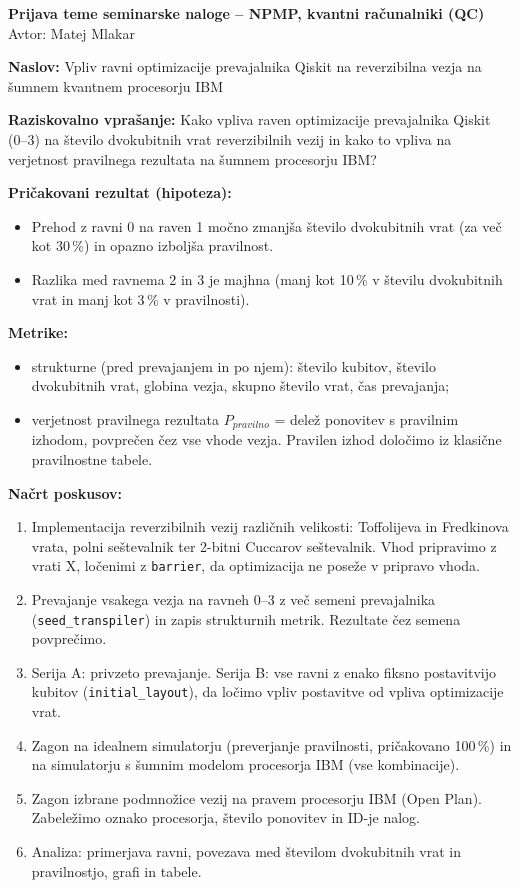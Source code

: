 \documentclass[11pt,a4paper]{article}
\begin{document}
{\large\textbf{Prijava teme seminarske naloge --
NPMP, kvantni računalniki (QC)}}\\
Avtor: Matej Mlakar \hfill 

\vspace{4pt}
\textbf{Naslov:} Vpliv ravni optimizacije prevajalnika Qiskit
na reverzibilna vezja na šumnem kvantnem procesorju IBM

\textbf{Raziskovalno vprašanje:} Kako vpliva raven optimizacije
prevajalnika Qiskit (0--3) na število dvokubitnih vrat
reverzibilnih vezij in kako to vpliva na
verjetnost pravilnega rezultata na šumnem procesorju IBM?

\textbf{Pričakovani rezultat (hipoteza):}
\begin{itemize}
  \item Prehod z ravni 0 na raven 1
  močno zmanjša število dvokubitnih vrat (za več
  kot 30\,\%) in opazno izboljša pravilnost.
  \item Razlika med ravnema 2 in 3 je majhna (manj kot 10\,\% 
  v številu dvokubitnih vrat in manj kot 3\,\% v pravilnosti).
\end{itemize}

\textbf{Metrike:}
\begin{itemize}
  \item strukturne (pred prevajanjem in po njem):
  število kubitov, število dvokubitnih vrat, globina vezja,
  skupno število vrat, čas prevajanja;
  \item verjetnost pravilnega rezultata $P_{pravilno}$ = delež ponovitev
  s pravilnim izhodom, povprečen čez vse vhode
  vezja. Pravilen izhod določimo iz klasične pravilnostne
  tabele.
\end{itemize}

\textbf{Načrt poskusov:}
\begin{enumerate}
  \item Implementacija reverzibilnih vezij različnih velikosti: Toffolijeva
  in Fredkinova vrata, polni seštevalnik ter 2-bitni
  Cuccarov seštevalnik. Vhod pripravimo
  z vrati X, ločenimi z \texttt{barrier}, da
  optimizacija ne poseže v pripravo vhoda.
  \item Prevajanje vsakega vezja na ravneh 0--3
  z več semeni prevajalnika (\texttt{seed\_transpiler}) in
  zapis strukturnih metrik. Rezultate čez semena povprečimo.
  \item Serija A: privzeto prevajanje. Serija B: vse
  ravni z enako fiksno postavitvijo kubitov (\texttt{initial\_layout}),
  da ločimo vpliv postavitve od vpliva
  optimizacije vrat.
  \item Zagon na idealnem simulatorju (preverjanje pravilnosti,
  pričakovano 100\,\%) in na simulatorju s šumnim
  modelom procesorja IBM (vse kombinacije).
  \item Zagon izbrane podmnožice vezij na pravem procesorju
  IBM (Open Plan). Zabeležimo oznako procesorja, število
  ponovitev in ID-je nalog.
  \item Analiza: primerjava ravni, povezava med številom
  dvokubitnih vrat in pravilnostjo, grafi in tabele.
\end{enumerate}
\end{document}
